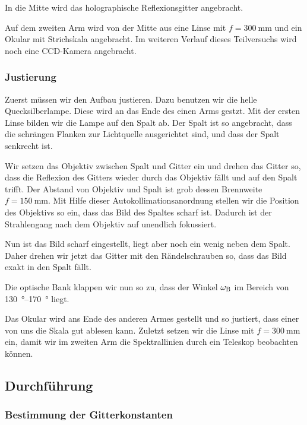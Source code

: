 In die Mitte wird das holographische Reflexionsgitter angebracht.

Auf dem zweiten Arm wird von der Mitte aus eine Linse mit $f =
\SI{300}{\milli\meter}$ und ein Okular mit Strichskala angebracht. Im weiteren
Verlauf dieses Teilversuchs wird noch eine CCD-Kamera angebracht.

\FloatBarrier
\subsubsection{Justierung}

Zuerst müssen wir den Aufbau justieren. Dazu benutzen wir die helle
Quecksilberlampe. Diese wird an das Ende des einen Arms gestzt. Mit der ersten
Linse bilden wir die Lampe auf den Spalt ab. Der Spalt ist so angebracht, dass
die schrängen Flanken zur Lichtquelle ausgerichtet sind, und dass der Spalt
senkrecht ist.

Wir setzen das Objektiv zwischen Spalt und Gitter ein und drehen das Gitter so,
dass die Reflexion des Gitters wieder durch das Objektiv fällt und auf den
Spalt trifft. Der Abstand von Objektiv und Spalt ist grob dessen Brennweite $f
= \SI{150}{\milli\meter}$. Mit Hilfe dieser Autokollimationsanordnung stellen
wir die Position des Objektivs so ein, dass das Bild des Spaltes scharf ist.
Dadurch ist der Strahlengang nach dem Objektiv auf unendlich fokussiert.

Nun ist das Bild scharf eingestellt, liegt aber noch ein wenig neben dem Spalt.
Daher drehen wir jetzt das Gitter mit den Rändelschrauben so, dass das Bild
exakt in den Spalt fällt.

Die optische Bank klappen wir nun so zu, dass der Winkel $\omega_\text B$ im
Bereich von \SIrange{130}{170}{\degree} liegt.

Das Okular wird ans Ende des anderen Armes gestellt und so justiert, dass einer
von uns die Skala gut ablesen kann. Zuletzt setzen wir die Linse mit $f =
\SI{300}{\milli\meter}$ ein, damit wir im zweiten Arm die Spektrallinien durch
ein Teleskop beobachten können.

\FloatBarrier
\subsection{Durchführung}

\FloatBarrier
\subsubsection{Bestimmung der Gitterkonstanten}
\label{sec:gitterkonstante/durchführung}


